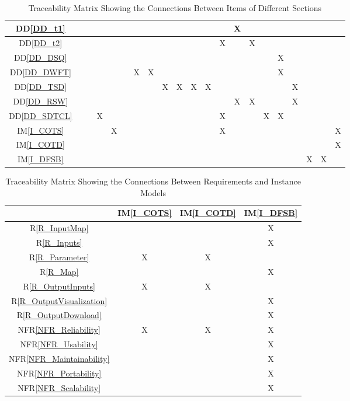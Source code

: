 \documentclass[12pt]{article}
\newcommand{\ddref}[1]{DD\ref{#1}}
\newcommand{\iref}[1]{IM\ref{#1}}
\newcommand{\rref}[1]{R\ref{#1}}
\newcommand{\nfrref}[1]{NFR\ref{#1}}
\begin{document}
\begin{landscape}
\begin{table}[H]
\begin{tabular}{|c|c|c|c|c|c|c|c|c|c|c|c|c|c|c|c|c|c|c|c|c|}
\ddref{DD_t1}        &  &  &  & & &  & &  &  &  &  & & X &  &  & &&  & & \\ \hline
\ddref{DD_t2}        &  &  &  & & &  & &  &  &  &  & X & &  X &  & &&  & & \\ \hline
\ddref{DD_DSQ}     &  &  &  & & &  & &  &  &  &  & & &  &  & X &&  & &  \\ \hline
\ddref{DD_DWFT}     &  &  &  & & & X & X &  &  &  &  & & &  &  & X &&  & & \\ \hline
\ddref{DD_TSD}     &  &  &  & & &  & & X & X & X & X & & &  &  & &X&  & & \\ \hline
\ddref{DD_RSW}      &  &  &  & & &  & &  &  &  &  & & X & X &  & &X&  & & \\ \hline
\ddref{DD_SDTCL}    &  &  & X & & &  & &  &  &  &  & X & &  &  X&X &&  & & \\ \hline
\iref{I_COTS}        &  &  &  & X & &  & &  &  &  &  &  X & &  &  & &&  & & X \\ \hline
\iref{I_COTD}        &  &  &  & & &  & &  &  &  &  & & &  &  & &&  & & X \\ \hline
\iref{I_DFSB}       &  &  &  & & &  & &  &  &  &  & & &  &  & &&  X & X & \\ \hline
\hline
\end{tabular}
\caption{Traceability Matrix Showing the Connections Between Items of Different Sections}
\label{Table:A_trace}
\end{table}
 \end{landscape}

\newpage
\begin{table}[H]
\centering
\begin{tabular}{|c|c|c|c|}
\hline 
	& \iref{I_COTS} & \iref{I_COTD} & \iref{I_DFSB}  \\

\hline
\rref{R_InputMap} & & & X  \\ \hline
\rref{R_Inputs}     & & & X \\ \hline

\rref{R_Parameter} & X & X &  \\ \hline

\rref{R_Map} &&& X \\ \hline
\rref{R_OutputInputs} & X  &X & \\ \hline
\rref{R_OutputVisualization} & & & X\\ \hline

\rref{R_OutputDownload} &  & & X\\ \hline
\nfrref{NFR_Reliability}   & X & X & X \\ \hline
\nfrref{NFR_Usability}   & & & X \\ \hline
\nfrref{NFR_Maintainability}   & & & X \\ \hline
\nfrref{NFR_Portability}   & & & X \\ \hline
\nfrref{NFR_Scalability}   & & & X \\
\hline
\end{tabular}
\caption{Traceability Matrix Showing the Connections Between Requirements and Instance Models}
\label{Table:R_trace}
\end{table}
\end{document}
